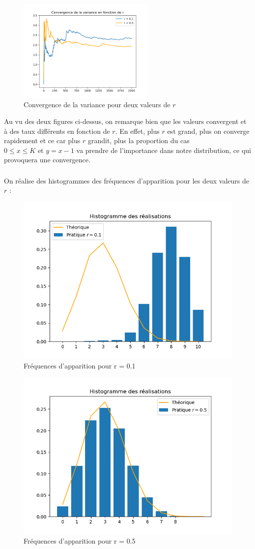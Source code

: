 \begin{figure}[H]
  \centering
  \includegraphics[width=0.6\textwidth]{figs/convergence_var.png}
  \caption{Convergence de la variance pour deux valeurs de $r$}
\end{figure}

Au vu des deux figures ci-dessus, on remarque bien que les valeurs convergent et à des taux différents en fonction de $r$. En effet, plus $r$ est grand, plus on converge rapidement et ce car 
plus $r$ grandit, plus la proportion du cas $0 \leq x \leq K \text{ et } y = x-1$ va prendre de l'importance dans notre distribution, ce qui provoquera une convergence. 

\subsubsection{}
On réalise des histogrammes des fréquences d'apparition pour les deux valeurs de $r$ :

\begin{figure}[H]
  \centering
  \includegraphics[width=.6\textwidth]{figs/histo1.png}
  \caption{Fréquences d'apparition pour r = 0.1}
\end{figure}
\begin{figure}[H]
  \centering
  \includegraphics[width=.6\textwidth]{figs/histo2.png}
  \caption{Fréquences d'apparition pour r = 0.5}
\end{figure}

